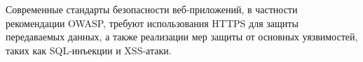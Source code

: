 
Современные стандарты безопасности веб-приложений, в частности рекомендации OWASP\cite{owasp}, требуют использования HTTPS для защиты передаваемых данных, а также реализации мер защиты от основных уязвимостей, таких как SQL-инъекции и XSS-атаки.